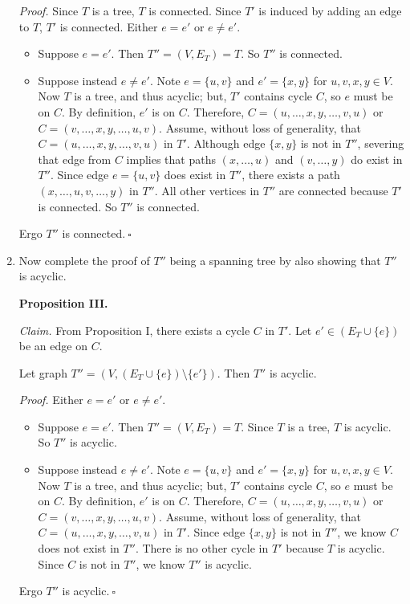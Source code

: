 \begin{enumerate}
\begin{solution}
\textit{Proof. }Since $T$ is a tree, $T$ is connected. Since $T'$ is induced by adding an edge to $T$, $T'$ is connected. Either $e=e'$ or $e\neq e'$.
\begin{itemize}
\item Suppose $e=e'$. Then $T''=(V,E_T)=T$. So $T''$ is connected.
\item Suppose instead $e\neq e'$. Note $e=\{u,v\}$ and $e'=\{x,y\}$ for $u,v,x,y\in V$. Now $T$ is a tree, and thus acyclic; but, $T'$ contains cycle $C$, so $e$ must be on $C$. By definition, $e'$ is on $C$. Therefore, $C=(u,\dots,x,y,\dots,v,u)$ or $C=(v,\dots,x,y,\dots,u,v)$. Assume, without loss of generality, that $C=(u,\dots,x,y,\dots,v,u)$ in $T'$. Although edge $\{x,y\}$ is not in $T''$, severing that edge from $C$ implies that paths $(x,\dots,u)$ and $(v,\dots,y)$ do exist in $T''$. Since edge $e=\{u,v\}$ does exist in $T''$, there exists a path $(x,\dots,u,v,\dots,y)$ in $T''$. All other vertices in $T''$ are connected because $T'$ is connected. So $T''$ is connected.
\end{itemize}
Ergo $T''$ is connected.$~\square$
\end{solution}
\newpage
\item Now complete the proof of $T''$ being a spanning tree by also showing that $T''$ is acyclic.
\begin{solution}

\textbf{Proposition III. }

\textit{Claim. }From Proposition I, there exists a cycle $C$ in $T'$. Let $e'\in(E_T\cup\{e\})$ be an edge on $C$.

Let graph $T''=(V,(E_T\cup\{e\})\setminus\{e'\})$. Then $T''$ is acyclic.

\textit{Proof. }Either $e=e'$ or $e\neq e'$.
\begin{itemize}
    \item Suppose $e=e'$. Then $T''=(V,E_T)=T$. Since $T$ is a tree, $T$ is acyclic. So $T''$ is acyclic.
    \item Suppose instead $e\neq e'$. Note $e=\{u,v\}$ and $e'=\{x,y\}$ for $u,v,x,y\in V$. Now $T$ is a tree, and thus acyclic; but, $T'$ contains cycle $C$, so $e$ must be on $C$. By definition, $e'$ is on $C$. Therefore, $C=(u,\dots,x,y,\dots,v,u)$ or $C=(v,\dots,x,y,\dots,u,v)$. Assume, without loss of generality, that $C=(u,\dots,x,y,\dots,v,u)$ in $T'$. Since edge $\{x,y\}$ is not in $T''$, we know $C$ does not exist in $T''$. There is no other cycle in $T'$ because $T$ is acyclic. Since $C$ is not in $T''$, we know $T''$ is acyclic.
\end{itemize}
Ergo $T''$ is acyclic.$~\square$


\end{solution}
\end{enumerate}
